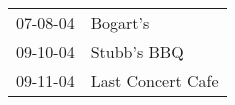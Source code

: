 \begin{supertabular}{p{0.07\textwidth}p{0.23\textwidth}}
 07-08-04 &           Bogart's \\
 09-10-04 &        Stubb's BBQ \\
 09-11-04 &  Last Concert Cafe \\
\end{supertabular}
